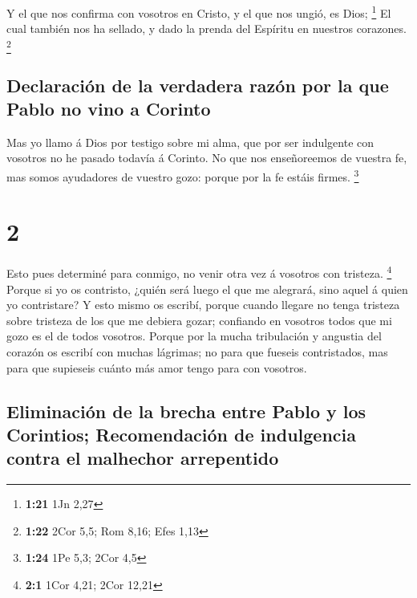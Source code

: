  Y el que nos confirma con vosotros en Cristo, y el que nos
ungió, es Dios; \footnote{\textbf{1:21} 1Jn 2,27}  El cual
también nos ha sellado, y dado la prenda del Espíritu en nuestros
corazones. \footnote{\textbf{1:22} 2Cor 5,5; Rom 8,16; Efes 1,13}

\hypertarget{declaraciuxf3n-de-la-verdadera-razuxf3n-por-la-que-pablo-no-vino-a-corinto}{%
\subsection{Declaración de la verdadera razón por la que Pablo no vino a
Corinto}\label{declaraciuxf3n-de-la-verdadera-razuxf3n-por-la-que-pablo-no-vino-a-corinto}}

 Mas yo llamo á Dios por testigo sobre mi alma, que por ser
indulgente con vosotros no he pasado todavía á Corinto.  No
que nos enseñoreemos de vuestra fe, mas somos ayudadores de vuestro
gozo: porque por la fe estáis firmes. \footnote{\textbf{1:24} 1Pe 5,3;
  2Cor 4,5}

\hypertarget{section-1}{%
\section{2}\label{section-1}}

 Esto pues determiné para conmigo, no venir otra vez á
vosotros con tristeza. \footnote{\textbf{2:1} 1Cor 4,21; 2Cor 12,21}
 Porque si yo os contristo, ¿quién será luego el que me
alegrará, sino aquel á quien yo contristare?  Y esto mismo
os escribí, porque cuando llegare no tenga tristeza sobre tristeza de
los que me debiera gozar; confiando en vosotros todos que mi gozo es el
de todos vosotros.  Porque por la mucha tribulación y
angustia del corazón os escribí con muchas lágrimas; no para que fueseis
contristados, mas para que supieseis cuánto más amor tengo para con
vosotros.

\hypertarget{eliminaciuxf3n-de-la-brecha-entre-pablo-y-los-corintios-recomendaciuxf3n-de-indulgencia-contra-el-malhechor-arrepentido}{%
\subsection{Eliminación de la brecha entre Pablo y los Corintios;
Recomendación de indulgencia contra el malhechor
arrepentido}\label{eliminaciuxf3n-de-la-brecha-entre-pablo-y-los-corintios-recomendaciuxf3n-de-indulgencia-contra-el-malhechor-arrepentido}}

